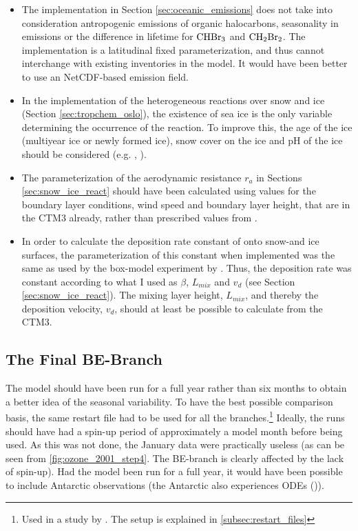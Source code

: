 \begin{itemize}
    \item The implementation in Section \ref{sec:oceanic_emissions} does not take into consideration antropogenic emissions of organic halocarbons, seasonality in emissions or the difference in lifetime for $\mathrm{CHBr_3}$ and $\mathrm{CH_2Br_2}$. The implementation is a latitudinal fixed parameterization, and thus cannot interchange with existing inventories in the model. It would have been better to use an NetCDF-based emission field. 
    \item In the implementation of the heterogeneous reactions over snow and ice (Section \ref{sec:tropchem_oslo}), the existence of sea ice is the only variable determining the occurrence of the reaction. To improve this, the age of the ice (multiyear ice or newly formed ice), snow cover on the ice and pH of the ice should be considered (e.g. \cite{Thomas2011}, \cite{Peterson2019}).
    \item The parameterization of the aerodynamic resistance $r_a$ in Sections \ref{sec:snow_ice_react} should have been calculated using values for the boundary layer conditions, wind speed and boundary layer height, that are in the CTM3 already, rather than prescribed values from \cite{CAO}. 
    \item In order to calculate the deposition rate constant of  onto snow-and ice surfaces, the parameterization of this constant when implemented was the same as used by the box-model experiment by \cite{CAO}. Thus, the deposition rate was constant according to what I used as $\beta$, $L_{mix}$ and $v_d$ (see Section \ref{sec:snow_ice_react}). The mixing layer height, $L_{mix}$, and thereby the deposition velocity, $v_d$, should at least be possible to calculate from the CTM3. 
\end{itemize}


\subsection{The Final BE-Branch}


The model should have been run for a full year rather than six months to obtain a better idea of the seasonal variability. To have the best possible comparison basis, the same restart file had to be used for all the branches.\footnote{Used in a study by \cite{Falk_2019}. The setup is explained in \ref{subsec:restart_files}} Ideally, the runs should have had a spin-up period of approximately a model month before being used. As this was not done, the January data were practically useless (as can be seen from \ref{fig:ozone_2001_step4}. The BE-branch is clearly affected by the lack of spin-up). Had the model been run for a full year, it would have been possible to include Antarctic observations (the Antarctic also experiences ODEs (\cite{Simpson2015})).

